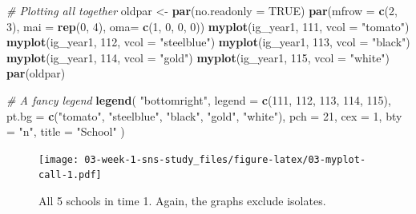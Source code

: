 \documentclass[]{book}
\newenvironment{Shaded}{\begin{snugshade}}{\end{snugshade}}
\newcommand{\CommentTok}[1]{\textcolor[rgb]{0.56,0.35,0.01}{\textit{#1}}}
\newcommand{\DataTypeTok}[1]{\textcolor[rgb]{0.13,0.29,0.53}{#1}}
\newcommand{\DecValTok}[1]{\textcolor[rgb]{0.00,0.00,0.81}{#1}}
\newcommand{\KeywordTok}[1]{\textcolor[rgb]{0.13,0.29,0.53}{\textbf{#1}}}
\newcommand{\NormalTok}[1]{#1}
\newcommand{\OtherTok}[1]{\textcolor[rgb]{0.56,0.35,0.01}{#1}}
\newcommand{\StringTok}[1]{\textcolor[rgb]{0.31,0.60,0.02}{#1}}
\begin{document}
\begin{Shaded}
\begin{Highlighting}[]
\CommentTok{# Plotting all together}
\NormalTok{oldpar <-}\StringTok{ }\KeywordTok{par}\NormalTok{(}\DataTypeTok{no.readonly =} \OtherTok{TRUE}\NormalTok{)}
\KeywordTok{par}\NormalTok{(}\DataTypeTok{mfrow =} \KeywordTok{c}\NormalTok{(}\DecValTok{2}\NormalTok{, }\DecValTok{3}\NormalTok{), }\DataTypeTok{mai =} \KeywordTok{rep}\NormalTok{(}\DecValTok{0}\NormalTok{, }\DecValTok{4}\NormalTok{), }\DataTypeTok{oma=} \KeywordTok{c}\NormalTok{(}\DecValTok{1}\NormalTok{, }\DecValTok{0}\NormalTok{, }\DecValTok{0}\NormalTok{, }\DecValTok{0}\NormalTok{))}
\KeywordTok{myplot}\NormalTok{(ig_year1, }\DecValTok{111}\NormalTok{, }\DataTypeTok{vcol =} \StringTok{"tomato"}\NormalTok{)}
\KeywordTok{myplot}\NormalTok{(ig_year1, }\DecValTok{112}\NormalTok{, }\DataTypeTok{vcol =} \StringTok{"steelblue"}\NormalTok{)}
\KeywordTok{myplot}\NormalTok{(ig_year1, }\DecValTok{113}\NormalTok{, }\DataTypeTok{vcol =} \StringTok{"black"}\NormalTok{)}
\KeywordTok{myplot}\NormalTok{(ig_year1, }\DecValTok{114}\NormalTok{, }\DataTypeTok{vcol =} \StringTok{"gold"}\NormalTok{)}
\KeywordTok{myplot}\NormalTok{(ig_year1, }\DecValTok{115}\NormalTok{, }\DataTypeTok{vcol =} \StringTok{"white"}\NormalTok{)}
\KeywordTok{par}\NormalTok{(oldpar)}

\CommentTok{# A fancy legend}
\KeywordTok{legend}\NormalTok{(}
  \StringTok{"bottomright"}\NormalTok{,}
  \DataTypeTok{legend =} \KeywordTok{c}\NormalTok{(}\DecValTok{111}\NormalTok{, }\DecValTok{112}\NormalTok{, }\DecValTok{113}\NormalTok{, }\DecValTok{114}\NormalTok{, }\DecValTok{115}\NormalTok{),}
  \DataTypeTok{pt.bg  =} \KeywordTok{c}\NormalTok{(}\StringTok{"tomato"}\NormalTok{, }\StringTok{"steelblue"}\NormalTok{, }\StringTok{"black"}\NormalTok{, }\StringTok{"gold"}\NormalTok{, }\StringTok{"white"}\NormalTok{),}
  \DataTypeTok{pch    =} \DecValTok{21}\NormalTok{,}
  \DataTypeTok{cex    =} \DecValTok{1}\NormalTok{,}
  \DataTypeTok{bty    =} \StringTok{"n"}\NormalTok{,}
  \DataTypeTok{title  =} \StringTok{"School"}
\NormalTok{  )}
\end{Highlighting}
\end{Shaded}

\begin{figure}
\centering
\texttt{[image: 03-week-1-sns-study\_files/figure-latex/03-myplot-call-1.pdf]}
\caption{\label{fig:03-myplot-call}All 5 schools in time 1. Again, the graphs exclude isolates.}
\end{figure}
\end{document}

